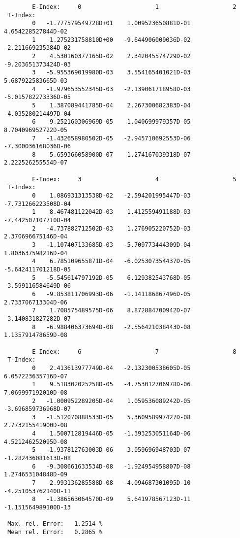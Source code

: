\begin{verbatim}
        E-Index:     0                     1                     2
 T-Index:
        0   -1.777579549728D+01    1.009523650881D-01    4.654228527844D-02
        1    1.275231758810D+00   -9.644906009036D-02   -2.211669235384D-02
        2    4.530160377165D-02    2.342045574729D-02   -9.203651373424D-03
        3   -5.955369019980D-03    3.554165401021D-03    5.687922583665D-03
        4   -1.979653552345D-03   -2.139061718958D-03   -5.015782273336D-05
        5    1.387089441785D-04    2.267300682383D-04   -4.035280214497D-04
        6    9.252160306969D-05    1.040699979357D-05    8.704096952722D-05
        7   -1.432658980502D-05   -2.945710692553D-06   -7.300036168036D-06
        8    5.659366058900D-07    1.274167039318D-07    2.222526255554D-07

        E-Index:     3                     4                     5
 T-Index:
        0    1.086931313538D-02   -2.594201995447D-03   -7.731266223508D-04
        1    8.467481122042D-03    1.412559491188D-03   -7.442507107710D-04
        2   -4.737882712502D-03    1.276905220752D-03    2.370696675146D-04
        3   -1.107407133685D-03   -5.709773444309D-04    1.803637598216D-04
        4    6.785109655871D-04   -6.025307354437D-05   -5.642411701218D-05
        5   -5.545614797192D-05    6.129382543768D-05   -3.599116584649D-06
        6   -9.853811706993D-06   -1.141186867496D-05    2.733706713304D-06
        7    1.708575489575D-06    8.872884700942D-07   -3.140831827282D-07
        8   -6.988406373694D-08   -2.556421038443D-08    1.135791478659D-08

        E-Index:     6                     7                     8
 T-Index:
        0    2.413613977749D-04   -2.132300538605D-05    6.057223635716D-07
        1    9.518302025258D-05   -4.753012706978D-06    7.069997192010D-08
        2   -1.000952289205D-04    1.059536089242D-05   -3.696859736968D-07
        3   -1.512070888533D-05    5.360958997427D-08    2.773215541900D-08
        4    1.500712819446D-05   -1.393253051164D-06    4.521246252095D-08
        5   -1.937812763003D-06    3.059696948703D-07   -1.282436081613D-08
        6   -9.308661633534D-08   -1.924954958807D-08    1.274653104848D-09
        7    2.993136285588D-08   -4.094687301095D-10   -4.251053762140D-11
        8   -1.386563064570D-09    5.641978567123D-11   -1.151564989100D-13

 Max. rel. Error:   1.2514 %
 Mean rel. Error:   0.2865 %
\end{verbatim}

